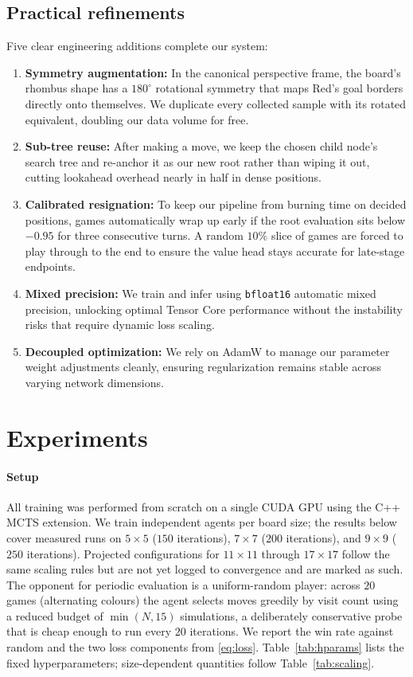 \documentclass[conference]{IEEEtran}
\begin{document}
\subsection{Practical refinements}
Five clear engineering additions complete our system:
\begin{enumerate}
  \item \textbf{Symmetry augmentation:} In the canonical perspective frame, the board's rhombus shape has a $180^\circ$ rotational symmetry that maps Red's goal borders directly onto themselves. We duplicate every collected sample with its rotated equivalent, doubling our data volume for free.
  \item \textbf{Sub-tree reuse:} After making a move, we keep the chosen child node's search tree and re-anchor it as our new root rather than wiping it out, cutting lookahead overhead nearly in half in dense positions.
  \item \textbf{Calibrated resignation:} To keep our pipeline from burning time on decided positions, games automatically wrap up early if the root evaluation sits below $-0.95$ for three consecutive turns. A random $10\%$ slice of games are forced to play through to the end to ensure the value head stays accurate for late-stage endpoints.
  \item \textbf{Mixed precision:} We train and infer using \texttt{bfloat16} automatic mixed precision, unlocking optimal Tensor Core performance without the instability risks that require dynamic loss scaling.
  \item \textbf{Decoupled optimization:} We rely on AdamW \cite{loshchilov2019decoupled} to manage our parameter weight adjustments cleanly, ensuring regularization remains stable across varying network dimensions.
\end{enumerate}

\section{Experiments}
\label{sec:experiments}

\paragraph{Setup} All training was performed from scratch on a single CUDA GPU using the
C++ MCTS extension. We train independent agents per board size; the results below cover
measured runs on $5\times5$ ($150$ iterations), $7\times7$ ($200$ iterations), and
$9\times9$ ($250$ iterations). Projected configurations for $11\times11$ through
$17\times17$ follow the same scaling rules but are not yet logged to convergence and are
marked as such. The opponent for periodic evaluation is a uniform-random
player: across $20$ games (alternating colours) the agent selects moves greedily by visit
count using a reduced budget of $\min(N,15)$ simulations, a deliberately conservative
probe that is cheap enough to run every $20$ iterations. We report the win rate against
random and the two loss components from \eqref{eq:loss}. Table~\ref{tab:hparams} lists
the fixed hyperparameters; size-dependent quantities follow Table~\ref{tab:scaling}.
\end{document}
